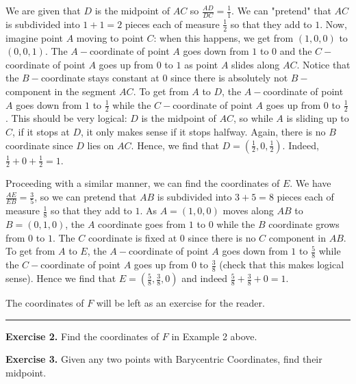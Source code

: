\documentclass{article}
\begin{document}
We are given that $D$ is the midpoint of $AC$ so $\frac{AD}{DC}=\frac 11$. We can "pretend" that $AC$ is subdivided into $1+1=2$ pieces each of measure $\frac 12$ so that they add to $1$. Now, imagine point $A$ moving to point $C$: when this happens, we get from $(1,0,0)$ to $(0,0,1)$. The $A-$coordinate of point $A$ goes down from $1$ to $0$ and the $C-$coordinate of point $A$ goes up from $0$ to $1$ as point $A$ slides along $AC$. Notice that the $B-$coordinate stays constant at $0$ since there is absolutely not $B-$ component in the segment $AC$. To get from $A$ to $D$, the $A-$coordinate of point $A$ goes down from $1$ to $\frac 12$ while the $C-$coordinate of point $A$ goes up from $0$ to $\frac 12$. This should be very logical: $D$ is the midpoint of $AC$, so while $A$ is sliding up to $C$, if it stops at $D$, it only makes sense if it stops halfway. Again, there is no $B$ coordinate since $D$ lies on $AC$. Hence, we find that $D=(\frac 12,0,\frac 12).$ Indeed, $\frac 12 + 0 + \frac 12 =1$. 

Proceeding with a similar manner, we can find the coordinates of $E$. We have $\frac{AE}{EB}=\frac 35$, so we can pretend that $AB$ is subdivided into $3+5=8$ pieces each of measure $\frac 18$ so that they add to $1$. As $A=(1,0,0)$ moves along $AB$ to $B=(0,1,0)$, the $A$ coordinate goes from $1$ to $0$ while the $B$ coordinate grows from $0$ to $1$. The $C$ coordinate is fixed at $0$ since there is no $C$ component in $AB$. To get from $A$ to $E$, the $A-$coordinate of point $A$ goes down from $1$ to $\frac 58$ while the $C-$coordinate of point $A$ goes up from $0$ to $\frac 38$ (check that this makes logical sense). Hence we find that $E=(\frac 58,\frac 38,0)$ and indeed $\frac 58 + \frac 38 + 0 =1$. 

The coordinates of $F$ will be left as an exercise for the reader.
\vspace{.2in}
\hrule
\vspace{.2in}
\textbf{Exercise 2.} Find the coordinates of $F$ in Example 2 above.

\textbf{Exercise 3.} Given any two points with Barycentric Coordinates, find their midpoint. 
\end{document}

